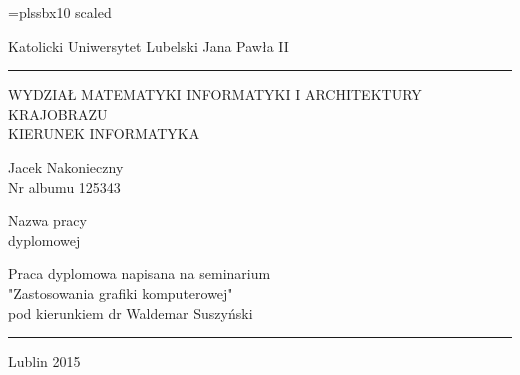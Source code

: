 \begin{titlepage}
\font\tfont=plssbx10 scaled  \centerline{\sc Katolicki Uniwersytet Lubelski Jana Pawła II}
\vskip1mm \hrule\vfill
	\begin{center}
	\large{WYDZIAŁ MATEMATYKI INFORMATYKI I ARCHITEKTURY KRAJOBRAZU\\KIERUNEK INFORMATYKA}
	\end{center}
\begin{figure}[ht]
\vspace{25mm}
\end{figure}	
	\begin{center}	
	\large{Jacek Nakonieczny\\Nr albumu 125343}
	\end{center}
\begin{figure}[ht]
\vspace{20mm}
\end{figure}	
	\begin{center}
	\tfont Nazwa pracy\\ dyplomowej\\[0.5cm] \rm
	\end{center}
\vfill
\begin{flushright}
\parbox[t]{8.5cm}{\sf Praca dyplomowa napisana na seminarium\\"Zastosowania grafiki komputerowej"\\
pod kierunkiem dr Waldemar Suszyński}
\end{flushright}
\vspace{1cm} \hrule \vskip1mm \centerline{\sc Lublin 2015}
\end{titlepage}